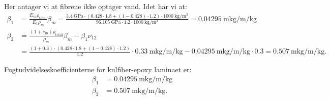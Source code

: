 \begin{derivation}
  \derivationpart

  Her antager vi at fibrene ikke optager vand.
  Idet har vi at:
  \begin{align*}
    \beta_1 &= \frac{E_m \rho_{\text{total}}}{E_1 \rho_m} \beta_m = \frac{\qty{3,4}{\GPa} \cdot \left( \num{0,428} \cdot \num{1,8} + \left( 1 - \num{0,428} \right) \cdot \num{1,2} \right) \cdot \qty{1000}{\kg\per\m\cubed} }{\qty{96,105}{\GPa} \cdot \num{1,2} \cdot \qty{1000}{\kg\per\m\cubed} }  = \qty{0.04295}{\m\kg\per\m\per\kg} \\
    \beta_2 &= \frac{\left( 1 + \nu_m \right)\rho_{\text{total}}}{\rho_m} \beta_m - \beta_1 \nu_{12} \\ 
    &= \frac{(1 + \num{0,3}) \cdot \left( \num{0,428} \cdot \num{1,8} + \left( 1 - \num{0,428}  \right) \cdot \num{1,2}  \right) }{\num{1,2}} \cdot \qty{0,33}{\m\kg\per\m\per\kg}  -  \qty{0,04295}{\m\kg\per\m\per\kg} \cdot \num{0,3} = \qty{0,507}{\m\kg\per\m\per\kg} 
  .\end{align*}

  \begin{subresult}
    Fugtudvidelseskoefficienterne for kulfiber-epoxy laminaet er:
    \begin{align*}
      \beta_1 &= \qty{0,04295}{\m\kg\per\m\per\kg} \\
      \beta_2 &= \qty{0,507}{\m\kg\per\m\per\kg} 
    .\end{align*}
  \end{subresult}
\end{derivation}

